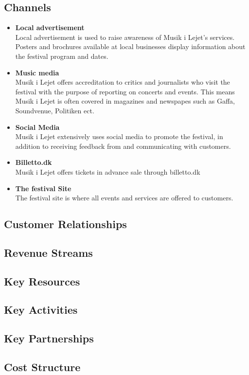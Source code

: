\subsection{Channels} %
\label{sub:channels}
\begin{itemize}
	\item \textbf{Local advertisement}\\
		Local advertisement is used to raise awareness of Musik i Lejet's services. Posters and brochures available at local businesses display information about the festival program and dates.
	\item \textbf{Music media}\\
		Musik i Lejet offers accreditation to critics and journalists who visit the festival with the purpose of reporting on concerts and events. This means Musik i Lejet is often covered in magazines and newspapes such as Gaffa, Soundvenue, Politiken ect.
	\item \textbf{Social Media}\\
		Musik i Lejet extensively uses social media to promote the festival, in addition to receiving feedback from and communicating with customers.
	\item \textbf{Billetto.dk}\\
		Musik i Lejet offers tickets in advance sale through billetto.dk
	\item \textbf{The festival Site}\\
		The festival site is where all events and services are offered to customers. 
\end{itemize}
\subsection{Customer Relationships} %
\label{sub:customer_relationships}

\subsection{Revenue Streams} %
\label{sub:revenue_streams}

\subsection{Key Resources} %
\label{sub:key_resources}

\subsection{Key Activities} %
\label{sub:key_activities}

\subsection{Key Partnerships} %
\label{sub:key_partnerships}

\subsection{Cost Structure} %
\label{sub:cost_structure}
